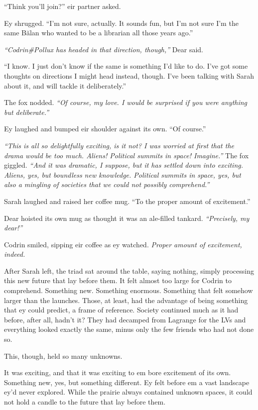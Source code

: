 ``Think you'll join?'' eir partner asked.

Ey shrugged. ``I'm not sure, actually. It sounds fun, but I'm not sure I'm the same Bălan who wanted to be a librarian all those years ago.''

\emph{``Codrin\#Pollux has headed in that direction, though,''} Dear said.

``I know. I just don't know if the same is something I'd like to do. I've got some thoughts on directions I might head instead, though. I've been talking with Sarah about it, and will tackle it deliberately.''

The fox nodded. \emph{``Of course, my love. I would be surprised if you were anything but deliberate.''}

Ey laughed and bumped eir shoulder against its own. ``Of course.''

\emph{``This is all so delightfully exciting, is it not? I was worried at first that the drama would be too much. Aliens! Political summits in space! Imagine.''} The fox giggled. \emph{``And it was dramatic, I suppose, but it has settled down into exciting. Aliens, yes, but boundless new knowledge. Political summits in space, yes, but also a mingling of societies that we could not possibly comprehend.''}

Sarah laughed and raised her coffee mug. ``To the proper amount of excitement.''

Dear hoisted its own mug as thought it was an ale-filled tankard. \emph{``Precisely, my dear!''}

Codrin smiled, sipping eir coffee as ey watched. \emph{Proper amount of excitement, indeed.}

After Sarah left, the triad sat around the table, saying nothing, simply processing this new future that lay before them. It felt almost too large for Codrin to comprehend. Something new. Something enormous. Something that felt somehow larger than the launches. Those, at least, had the advantage of being something that ey could predict, a frame of reference. Society continued much as it had before, after all, hadn't it? They had decamped from Lagrange for the LVs and everything looked exactly the same, minus only the few friends who had not done so.

This, though, held so many unknowns.

It was exciting, and that it was exciting to em bore excitement of its own. Something new, yes, but something different. Ey felt before em a vast landscape ey'd never explored. While the prairie always contained unknown spaces, it could not hold a candle to the future that lay before them.

